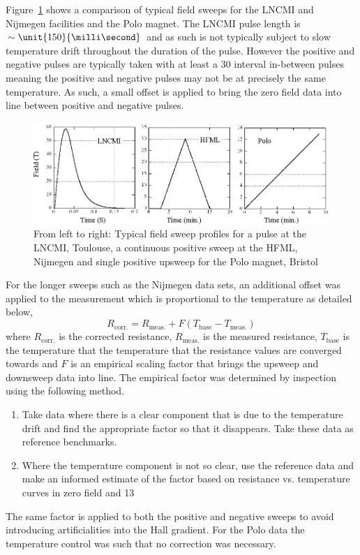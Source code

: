 Figure~\ref{Fig:Exp:ComparisonFieldSweeps} shows a comparison of typical field sweeps for the \ac{LNCMI} and Nijmegen facilities and the Polo magnet. The \ac{LNCMI} pulse length is $\sim\unit{150}{\milli\second}$ and as such is not typically subject to slow temperature drift throughout the duration of the pulse. However the positive and negative pulses are typically taken with at least a \unit{30}{\minute} interval in-between pulses meaning the positive and negative pulses may not be at precisely the same temperature. As such, a small offset is applied to bring the zero field data into line between positive and negative pulses.
\begin{figure}[htbp]
    \begin{center}
        \includegraphics[scale=0.9]{Chapter-ExperimentalTechnique/Figures/ComparisonFieldSweeps/ComparisonFieldSweeps}
        \caption{From left to right: Typical field sweep profiles for a pulse at the \ac{LNCMI}, Toulouse, a continuous positive sweep at the \ac{HFML}, Nijmegen and single positive upsweep for the Polo magnet, Bristol}
        \label{Fig:Exp:ComparisonFieldSweeps}
    \end{center}
\end{figure}
For the longer sweeps such as the Nijmegen data sets, an additional offset was applied to the measurement which is proportional to the temperature as detailed below,
\begin{equation}
    R_{\textrm{corr.}} = R_{\textrm{meas.}} + F(T_{\textrm{base}} - T_{\textrm{meas.}})
\end{equation}
where $R_{\textrm{corr.}}$ is the corrected resistance, $R_{\textrm{meas.}}$ is the measured resistance, $T_{\textrm{base}}$ is the temperature that the temperature that the resistance values are converged towards and $F$ is an empirical scaling factor that brings the upsweep and downsweep data into line. The empirical factor was determined by inspection using the following method.
\begin{enumerate}
\item Take data where there is a clear component that is due to the temperature drift and find the appropriate factor so that it disappears. Take these data as reference benchmarks.
\item Where the temperature component is not so clear, use the reference data and make an informed estimate of the factor based on resistance vs. temperature curves in zero field and \unit{13}{\tesla}
\end{enumerate}
The same factor is applied to both the positive and negative sweeps to avoid introducing artificialities into the Hall gradient. For the Polo data the temperature control was such that no correction was necessary.

